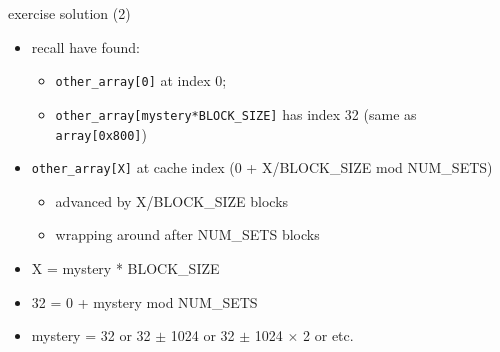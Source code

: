 \begin{frame}[fragile]{exercise solution (2)}
\begin{itemize}
\item recall have found:
    \begin{itemize}
    \item \texttt{other\_array[0]} at index 0;
    \item \texttt{other\_array[mystery*BLOCK\_SIZE]} has index 32 (same as \texttt{array[0x800]})
    \end{itemize}
\item \texttt{other\_array[X]} at cache index (0 + X/BLOCK\_SIZE  mod NUM\_SETS)
    \begin{itemize}
    \item advanced by X/BLOCK\_SIZE blocks
    \item wrapping around after NUM\_SETS blocks
    \end{itemize}
\vspace{.5cm}
\item X = mystery * BLOCK\_SIZE
\item 32 = 0 + mystery mod NUM\_SETS
\item mystery = 32 or 32 $\pm$ 1024 or 32 $\pm$ 1024 $\times$ 2 or etc.
\end{itemize}
\end{frame}
